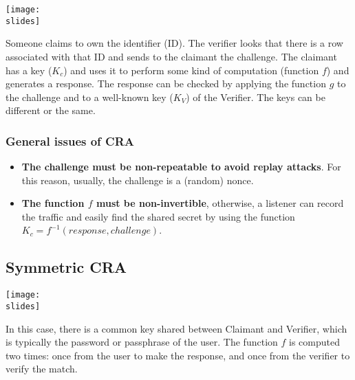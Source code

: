\vspace{2mm}
\noindent
\begin{minipage}{0.5\textwidth}
  \centering
  \texttt{[image: \\slides]}
\end{minipage}
\hspace{0.05\textwidth}
\begin{minipage}{0.4\textwidth}
  Someone claims to own the identifier (ID). The verifier looks that there is a row
  associated with that ID and sends to the
  claimant the challenge. The claimant has
  a key (\(K_c\)) and uses it to perform some
  kind of computation (function \(f\)) and
  generates a response. The response can
  be checked by applying the function \(g\) to
  the challenge and to a well-known key (\(K_V\)) of the Verifier. The keys can be different or the same.
\end{minipage}


\subsubsection*{General issues of CRA}
\begin{itemize}
  \item \textbf{The challenge must be non-repeatable to avoid replay attacks}. For this reason, usually, the challenge
        is a (random) nonce.
  \item \textbf{The function \(f\) must be non-invertible}, otherwise, a listener can record the traffic and easily find the
        shared secret by using the function \(K_c = f^{-1}(response, challenge)\).
\end{itemize}



\subsection{Symmetric CRA}

\noindent
\begin{minipage}{0.5\textwidth}
  \centering
  \texttt{[image: \\slides]}
\end{minipage}
\hspace{0.05\textwidth}
\begin{minipage}{0.4\textwidth}
  In this case, there is a common key
  shared between Claimant and Verifier,
  which is typically the password or
  passphrase of the user. The function \(f\) is computed two times: once from the user
  to make the response, and once from the
  verifier to verify the match.
\end{minipage}

